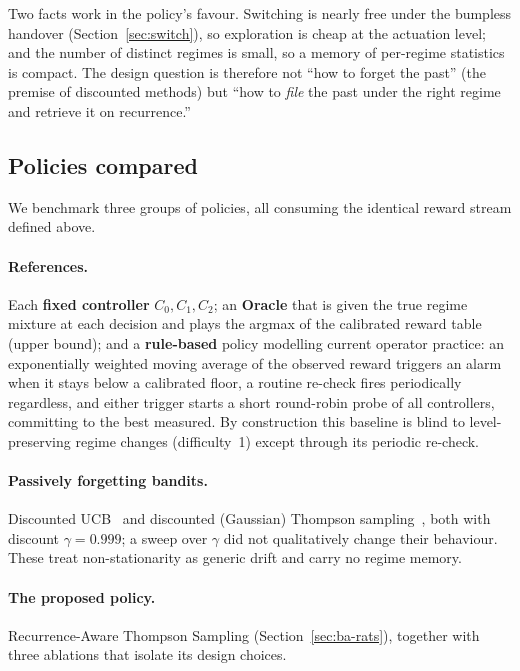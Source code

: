 \documentclass[11pt,a4paper]{article}
\newcommand{\Cz}{C_{0}}
\newcommand{\Co}{C_{1}}
\newcommand{\Ct}{C_{2}}
\begin{document}
Two facts work in the policy's favour. Switching is nearly free under the
bumpless handover (Section~\ref{sec:switch}), so exploration is cheap at the
actuation level; and the number of distinct regimes is small, so a memory of
per-regime statistics is compact. The design question is therefore not
``how to forget the past'' (the premise of discounted methods) but ``how to
\emph{file} the past under the right regime and retrieve it on recurrence.''

\subsection{Policies compared}\label{sec:ba-algos}
We benchmark three groups of policies, all consuming the identical reward
stream defined above.

\paragraph{References.} Each \textbf{fixed controller} $\Cz,\Co,\Ct$; an
\textbf{Oracle} that is given the true regime mixture at each decision and
plays the argmax of the calibrated reward table (upper bound); and a
\textbf{rule-based} policy modelling current operator practice: an
exponentially weighted moving average of the observed reward triggers an alarm
when it stays below a calibrated floor, a routine re-check fires periodically
regardless, and either trigger starts a short round-robin probe of all
controllers, committing to the best measured. By construction this baseline is
blind to level-preserving regime changes (difficulty~1) except through its
periodic re-check.

\paragraph{Passively forgetting bandits.} Discounted UCB~\cite{GarivierMoulines}
and discounted (Gaussian) Thompson sampling~\cite{Thompson,RussoTutorial}, both
with discount $\gamma = 0.999$; a sweep over $\gamma$ did not qualitatively
change their behaviour. These treat non-stationarity as generic drift and
carry no regime memory.

\paragraph{The proposed policy.} Recurrence-Aware Thompson Sampling
(Section~\ref{sec:ba-rats}), together with three ablations that isolate its
design choices.
\end{document}
